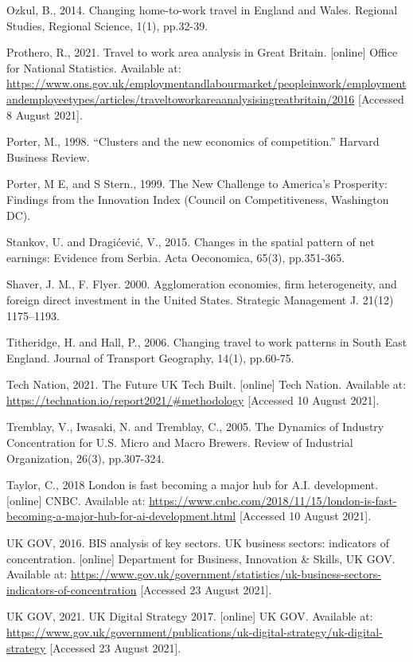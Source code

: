 \documentclass[
  12pt,
  oneside]{book}
\begin{document}
Ozkul, B., 2014. Changing home-to-work travel in England and Wales. Regional Studies, Regional Science, 1(1), pp.32-39.

Prothero, R., 2021. Travel to work area analysis in Great Britain. {[}online{]} Office for National Statistics. Available at: \url{https://www.ons.gov.uk/employmentandlabourmarket/peopleinwork/employmentandemployeetypes/articles/traveltoworkareaanalysisingreatbritain/2016} {[}Accessed 8 August 2021{]}.

Porter, M., 1998. ``Clusters and the new economics of competition.'' Harvard Business Review.

Porter, M E, and S Stern., 1999. The New Challenge to America's Prosperity: Findings from the Innovation Index (Council on Competitiveness, Washington DC).

Stankov, U. and Dragićević, V., 2015. Changes in the spatial pattern of net earnings: Evidence from Serbia. Acta Oeconomica, 65(3), pp.351-365.

Shaver, J. M., F. Flyer. 2000. Agglomeration economies, firm heterogeneity, and foreign direct investment in the United States. Strategic Management J. 21(12) 1175--1193.

Titheridge, H. and Hall, P., 2006. Changing travel to work patterns in South East England. Journal of Transport Geography, 14(1), pp.60-75.

Tech Nation, 2021. The Future UK Tech Built. {[}online{]} Tech Nation. Available at: \url{https://technation.io/report2021/\#methodology} {[}Accessed 10 August 2021{]}.

Tremblay, V., Iwasaki, N. and Tremblay, C., 2005. The Dynamics of Industry Concentration for U.S. Micro and Macro Brewers. Review of Industrial Organization, 26(3), pp.307-324.

Taylor, C., 2018 London is fast becoming a major hub for A.I. development. {[}online{]} CNBC. Available at: \url{https://www.cnbc.com/2018/11/15/london-is-fast-becoming-a-major-hub-for-ai-development.html} {[}Accessed 10 August 2021{]}.

UK GOV, 2016. BIS analysis of key sectors. UK business sectors: indicators of concentration. {[}online{]} Department for Business, Innovation \& Skills, UK GOV. Available at: \url{https://www.gov.uk/government/statistics/uk-business-sectors-indicators-of-concentration} {[}Accessed 23 August 2021{]}.

UK GOV, 2021. UK Digital Strategy 2017. {[}online{]} UK GOV. Available at: \url{https://www.gov.uk/government/publications/uk-digital-strategy/uk-digital-strategy} {[}Accessed 23 August 2021{]}.
\end{document}
